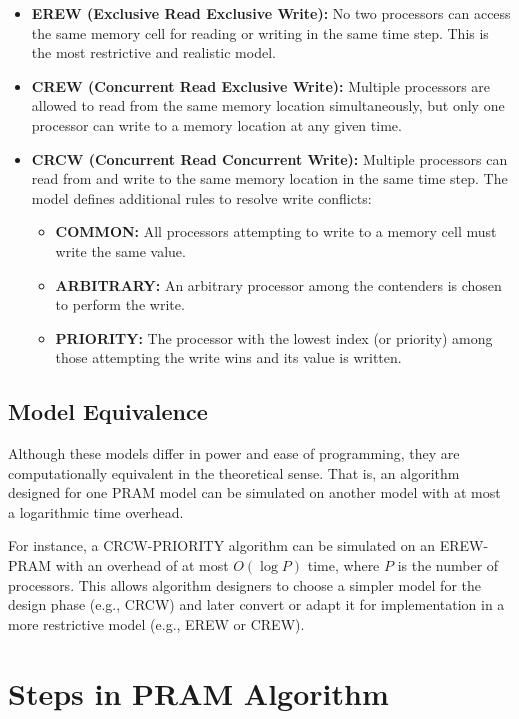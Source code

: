 \documentclass[12pt]{book}
\begin{document}
\begin{itemize}
    \item \textbf{EREW (Exclusive Read Exclusive Write):} No two processors can access the same memory cell for reading or writing in the same time step. This is the most restrictive and realistic model.
    
    \item \textbf{CREW (Concurrent Read Exclusive Write):} Multiple processors are allowed to read from the same memory location simultaneously, but only one processor can write to a memory location at any given time.
    
    \item \textbf{CRCW (Concurrent Read Concurrent Write):} Multiple processors can read from and write to the same memory location in the same time step. The model defines additional rules to resolve write conflicts:
    \begin{itemize}
        \item \textbf{COMMON:} All processors attempting to write to a memory cell must write the same value.
        \item \textbf{ARBITRARY:} An arbitrary processor among the contenders is chosen to perform the write.
        \item \textbf{PRIORITY:} The processor with the lowest index (or priority) among those attempting the write wins and its value is written.
    \end{itemize}
\end{itemize}

\subsection{Model Equivalence}
Although these models differ in power and ease of programming, they are computationally equivalent in the theoretical sense. That is, an algorithm designed for one PRAM model can be simulated on another model with at most a logarithmic time overhead.

For instance, a CRCW-PRIORITY algorithm can be simulated on an EREW-PRAM with an overhead of at most $O(\log P)$ time, where $P$ is the number of processors. This allows algorithm designers to choose a simpler model for the design phase (e.g., CRCW) and later convert or adapt it for implementation in a more restrictive model (e.g., EREW or CREW).

\section{Steps in PRAM Algorithm}
\end{document}
